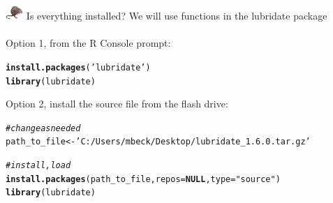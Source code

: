 \documentclass[xcolor=dvipsnames,serif]{beamer}\usepackage[]{graphicx}\usepackage[]{color}
\makeatletter
\newcommand{\hlstr}[1]{\textcolor[rgb]{0.192,0.494,0.8}{#1}}%
\newcommand{\hlcom}[1]{\textcolor[rgb]{0.678,0.584,0.686}{\textit{#1}}}%
\newcommand{\hlstd}[1]{\textcolor[rgb]{0.345,0.345,0.345}{#1}}%
\newcommand{\hlkwa}[1]{\textcolor[rgb]{0.161,0.373,0.58}{\textbf{#1}}}%
\newcommand{\hlkwb}[1]{\textcolor[rgb]{0.69,0.353,0.396}{#1}}%
\newcommand{\hlkwc}[1]{\textcolor[rgb]{0.333,0.667,0.333}{#1}}%
\newcommand{\hlkwd}[1]{\textcolor[rgb]{0.737,0.353,0.396}{\textbf{#1}}}%
\newenvironment{kframe}{%
 \def\at@end@of@kframe{}%
 \ifinner\ifhmode%
  \def\at@end@of@kframe{\end{minipage}}%
  \begin{minipage}{\columnwidth}%
 \fi\fi%
 \def\FrameCommand##1{\hskip\@totalleftmargin \hskip-\fboxsep
 \colorbox{shadecolor}{##1}\hskip-\fboxsep
     \hskip-\linewidth \hskip-\@totalleftmargin \hskip\columnwidth}%
 \MakeFramed {\advance\hsize-\width
   \@totalleftmargin\z@ \linewidth\hsize
   \@setminipage}}%
 {\par\unskip\endMakeFramed%
 \at@end@of@kframe}
\newenvironment{knitrout}{}{} %
\makeatother
\begin{document}
\begin{frame}[fragile]{\includegraphics[width = 0.05\textwidth]{imgs/swmprat.png} Is everything installed?}
We will use functions in the lubridate package \\~\\
Option 1, from the R Console prompt:
\begin{knitrout}\scriptsize
{}\color{fgcolor}\begin{kframe}
\begin{alltt}
\hlkwd{install.packages}\hlstd{(}\hlstr{'lubridate'}\hlstd{)}
\hlkwd{library}\hlstd{(lubridate)}
\end{alltt}
\end{kframe}
\end{knitrout}
\vspace{0.1in}
Option 2, install the source file from the flash drive:
\begin{knitrout}\scriptsize
{}\color{fgcolor}\begin{kframe}
\begin{alltt}
\hlcom{# change as needed}
\hlstd{path_to_file} \hlkwb{<-} \hlstr{'C:/Users/mbeck/Desktop/lubridate_1.6.0.tar.gz'}

\hlcom{# install, load}
\hlkwd{install.packages}\hlstd{(path_to_file,} \hlkwc{repos} \hlstd{=} \hlkwa{NULL}\hlstd{,} \hlkwc{type}\hlstd{=}\hlstr{"source"}\hlstd{)}
\hlkwd{library}\hlstd{(lubridate)}
\end{alltt}
\end{kframe}
\end{knitrout}
\end{frame}
\end{document}
